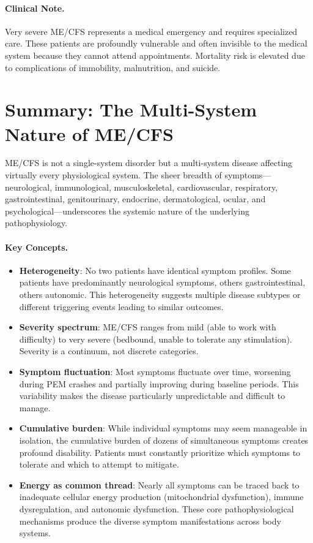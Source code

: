 \paragraph{Clinical Note.}
Very severe ME/CFS represents a medical emergency and requires specialized care. These patients are profoundly vulnerable and often invisible to the medical system because they cannot attend appointments. Mortality risk is elevated due to complications of immobility, malnutrition, and suicide.

\section{Summary: The Multi-System Nature of ME/CFS}
\label{sec:multisystem-summary}

ME/CFS is not a single-system disorder but a multi-system disease affecting virtually every physiological system. The sheer breadth of symptoms---neurological, immunological, musculoskeletal, cardiovascular, respiratory, gastrointestinal, genitourinary, endocrine, dermatological, ocular, and psychological---underscores the systemic nature of the underlying pathophysiology.

\paragraph{Key Concepts.}
\begin{itemize}
    \item \textbf{Heterogeneity}: No two patients have identical symptom profiles. Some patients have predominantly neurological symptoms, others gastrointestinal, others autonomic. This heterogeneity suggests multiple disease subtypes or different triggering events leading to similar outcomes.

    \item \textbf{Severity spectrum}: ME/CFS ranges from mild (able to work with difficulty) to very severe (bedbound, unable to tolerate any stimulation). Severity is a continuum, not discrete categories.

    \item \textbf{Symptom fluctuation}: Most symptoms fluctuate over time, worsening during PEM crashes and partially improving during baseline periods. This variability makes the disease particularly unpredictable and difficult to manage.

    \item \textbf{Cumulative burden}: While individual symptoms may seem manageable in isolation, the cumulative burden of dozens of simultaneous symptoms creates profound disability. Patients must constantly prioritize which symptoms to tolerate and which to attempt to mitigate.

    \item \textbf{Energy as common thread}: Nearly all symptoms can be traced back to inadequate cellular energy production (mitochondrial dysfunction), immune dysregulation, and autonomic dysfunction. These core pathophysiological mechanisms produce the diverse symptom manifestations across body systems.
\end{itemize}

